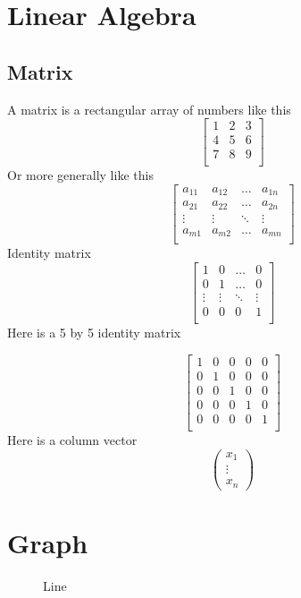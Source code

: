 \documentclass[letterpaper,10pt,twoside,twocolumn,openany]{book}
\begin{document}
\chapter{Linear Algebra}
\section{Matrix}
A matrix is a rectangular array of numbers like this 
\[ 
\begin{bmatrix}
  1 & 2 & 3 \\
  4 & 5 & 6 \\
  7 & 8 & 9 \\
\end{bmatrix}
  \]    
Or more generally like this
\[ 
\begin{bmatrix}
  a_{11} & a_{12} &\ldots & a_{1n} \\
  a_{21} & a_{22} & \ldots & a_{2n} \\
  \vdots & \vdots & \ddots & \vdots \\
  a_{m1} & a_{m 2} & \ldots & a_{mn} \\
\end{bmatrix}
\]
Identity matrix
\[ 
\begin{bmatrix}
  1 & 0 & \ldots & 0 \\
  0 & 1 & \ldots & 0 \\
  \vdots & \vdots & \ddots & \vdots \\
  0 & 0 & 0 & 1 \\
\end{bmatrix}
\]
Here is a 5 by 5 identity matrix 

\[ \begin{bmatrix}
  1 & 0 & 0 &0  &0  \\
  0 & 1 & 0 & 0 & 0 \\
  0 & 0 & 1 & 0 & 0 \\
  0 & 0 & 0 & 1 & 0 \\
  0 & 0 & 0 & 0 & 1 \\
\end{bmatrix}
 \] 
Here is a column vector
\[ \begin{pmatrix} x_1\\ \vdots\\ x_n \end{pmatrix} \] 

\twocolumn

\chapter{Graph}
\begin{figure}[!h]
  \centering
  \caption{Line}
  \label{plot:Line}
\end{figure}
\end{document}
